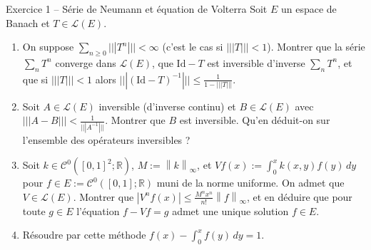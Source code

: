\documentclass[11pt,a4paper]{article}
\newcommand{\R}{\mathbb{R}}
\newcommand{\norm}[1]{\left\|#1\right\|}
\newcommand{\opnorm}[1]{|\!|\!|#1|\!|\!|}
\newcommand{\Lc}{\mathcal{L}}
\newcommand{\Cz}{\mathcal{C}^0}
\theoremstyle{definition}
\begin{document}
\begin{exo}{Exercice 1 -- Série de Neumann et équation de Volterra}
Soit $E$ un espace de Banach et $T\in\Lc(E)$.
\begin{enumerate}[label=(\alph*)]
  \item On suppose $\sum_{n\ge0}\opnorm{T^n}<\infty$ (c'est le cas si $\opnorm T<1$). Montrer que la série $\sum_nT^n$ converge dans $\Lc(E)$, que $\mathrm{Id}-T$ est inversible d'inverse $\sum_nT^n$, et que si $\opnorm T<1$ alors $\opnorm{(\mathrm{Id}-T)^{-1}}\le\frac1{1-\opnorm T}$.
  \item Soit $A\in\Lc(E)$ inversible (d'inverse continu) et $B\in\Lc(E)$ avec $\opnorm{A-B}<\frac1{\opnorm{A^{-1}}}$. Montrer que $B$ est inversible. Qu'en déduit-on sur l'ensemble des opérateurs inversibles ?
  \item Soit $k\in\Cz([0,1]^2;\R)$, $M:=\norm k_\infty$, et $Vf(x):=\int_0^xk(x,y)f(y)\,dy$ pour $f\in E:=\Cz([0,1];\R)$ muni de la norme uniforme. On admet que $V\in\Lc(E)$. Montrer que $|V^nf(x)|\le\frac{M^nx^n}{n!}\norm f_\infty$, et en déduire que pour toute $g\in E$ l'équation $f-Vf=g$ admet une unique solution $f\in E$.
  \item Résoudre par cette méthode $f(x)-\int_0^xf(y)\,dy=1$.
\end{enumerate}
\end{exo}
\end{document}

